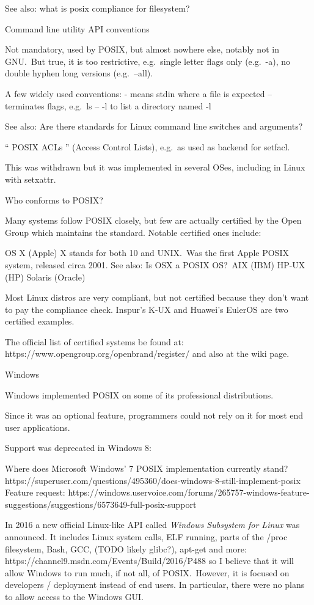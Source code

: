     See also: what is posix compliance for filesystem?

    Command line utility API conventions

    Not mandatory, used by POSIX, but almost nowhere else, notably not in GNU.\
	But true, it is too restrictive, e.g.\ single letter flags only (e.g.\ -a),
	no double hyphen long versions (e.g.\ --all).

    A few widely used conventions:
        - means stdin where a file is expected
        -- terminates flags, e.g.\ ls -- -l to list a directory named -l

    See also: Are there standards for Linux command line switches and arguments?

    `` POSIX ACLs '' (Access Control Lists), e.g.\ as used as backend for setfacl.

    This was withdrawn but it was implemented in several OSes, including in Linux with setxattr.

Who conforms to POSIX?\

Many systems follow POSIX closely, but few are actually certified by the Open Group which maintains the standard. Notable certified ones include:

    OS X (Apple) X stands for both 10 and UNIX.\ Was the first Apple POSIX
	system, released circa 2001. See also: Is OSX a POSIX OS?\
    AIX (IBM)
    HP-UX (HP)
    Solaris (Oracle)

Most Linux distros are very compliant, but not certified because they don't want to pay the compliance check. Inspur's K-UX and Huawei's EulerOS are two certified examples.

The official list of certified systems be found at: https://www.opengroup.org/openbrand/register/ and also at the wiki page.

Windows

Windows implemented POSIX on some of its professional distributions.

Since it was an optional feature, programmers could not rely on it for most end user applications.

Support was deprecated in Windows 8:

    Where does Microsoft Windows' 7 POSIX implementation currently stand?
    https://superuser.com/questions/495360/does-windows-8-still-implement-posix
    Feature request: https://windows.uservoice.com/forums/265757-windows-feature-suggestions/suggestions/6573649-full-posix-support

In 2016 a new official Linux-like API called \textit{Windows Subsystem for
	Linux} was announced. It includes Linux system calls, ELF running, parts of
the /proc filesystem, Bash, GCC, (TODO likely glibc?), apt-get and more:
https://channel9.msdn.com/Events/Build/2016/P488 so I believe that it will allow
Windows to run much, if not all, of POSIX.\ However, it is focused on developers
/ deployment instead of end users. In particular, there were no plans to allow
access to the Windows GUI.\

